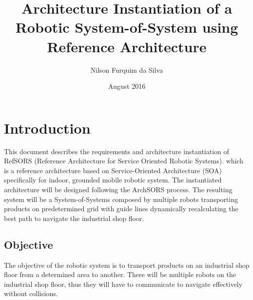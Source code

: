 \documentclass{article}
\title{Architecture Instantiation of a Robotic System-of-System using Reference Architecture}
\author{Nilson Furquim da Silva}
\date{August 2016}
\begin{document}
\maketitle

\section*{Introduction}
This document describes the requirements and architecture instantiation of RefSORS (Reference Architecture for Service Oriented Robotic Systems). which is a reference architecture based on Service-Oriented Architecture (SOA) specifically for indoor, grounded mobile robotic system. The instantiated architecture will be designed following the ArchSORS process. The resulting system will be a System-of-Systems composed by multiple robots transporting products on predetermined grid with guide lines dynamically recalculating the best path to navigate the industrial shop floor.

\subsection*{Objective}
The objective of the robotic system is to transport products on an industrial shop floor from a determined area to another. There will be multiple robots on the industrial shop floor, thus they will have to communicate to navigate effectively without collisions.







\end{document}
